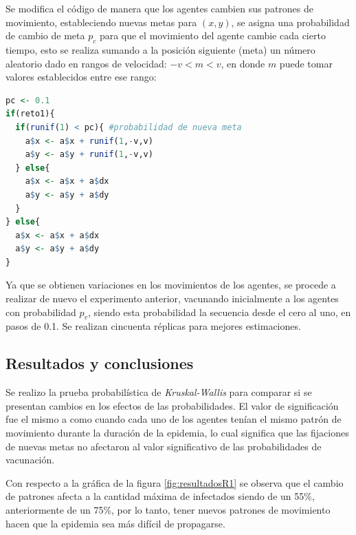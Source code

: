 \documentclass{article}
\begin{document}
Se modifica el c\'odigo de manera que los agentes cambien sus patrones de movimiento, estableciendo nuevas metas para $(x,y)$, se asigna una probabilidad de cambio de meta $p_c$ para que el movimiento del agente cambie cada cierto tiempo, esto se realiza sumando a la posici\'on siguiente (meta) un n\'umero aleatorio dado en rangos de velocidad: $-v < m < v$, en donde $m$ puede tomar valores establecidos entre ese rango:

\begin{lstlisting}[language=R]
pc <- 0.1
if(reto1){
  if(runif(1) < pc){ #probabilidad de nueva meta
    a$x <- a$x + runif(1,-v,v)
    a$y <- a$y + runif(1,-v,v)
  } else{
    a$x <- a$x + a$dx
    a$y <- a$y + a$dy
  }
} else{
  a$x <- a$x + a$dx
  a$y <- a$y + a$dy
}
\end{lstlisting}

Ya que se obtienen variaciones en los movimientos de los agentes, se procede a realizar de nuevo el experimento anterior, vacunando inicialmente a los agentes con probabilidad $p_v$, siendo esta probabilidad la secuencia desde el cero al uno, en pasos de 0.1. Se realizan cincuenta r\'eplicas para mejores estimaciones.

\subsection{Resultados y conclusiones}

Se realizo la prueba probabil\'istica de \textit{Kruskal-Wallis} para comparar si se presentan cambios en los efectos de las probabilidades. El valor de significaci\'on fue el mismo a como cuando cada uno de los agentes ten\'ian el mismo patr\'on de movimiento durante la duraci\'on de la epidemia, lo cual significa que las fijaciones de nuevas metas no afectaron al valor significativo de las probabilidades de vacunaci\'on. 

Con respecto a la gr\'afica de la figura \ref{fig:resultadosR1} se observa que el cambio de patrones afecta a la cantidad m\'axima de infectados siendo de un 55\%, anteriormente de un 75\%,  por lo tanto, tener nuevos patrones de movimiento hacen que la epidemia sea m\'as dif\'icil de propagarse.

\newpage
\end{document}
